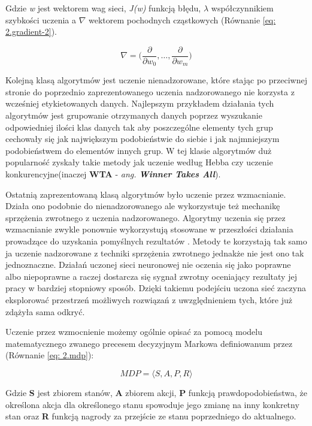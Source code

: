 \documentclass[12pt, oneside, a4paper]{report}
\begin{document}
Gdzie \textit{w} jest wektorem wag sieci, \textit{J(w)} funkcją błędu, $\lambda$ współczynnikiem szybkości uczenia a $\nabla$ wektorem pochodnych cząstkowych (Równanie \ref{eq: 2.gradient-2}).

\begin{equation}\label{eq: 2.gradient-2}
	\nabla = \bigg( \frac{\partial}{\partial w_0}, \dots ,\frac{\partial}{\partial w_m} \bigg)
\end{equation}

Kolejną klasą algorytmów jest uczenie nienadzorowane, które stając po przeciwnej stronie do poprzednio zaprezentowanego uczenia nadzorowanego nie korzysta z wcześniej etykietowanych danych. Najlepszym przykładem działania tych algorytmów jest grupowanie otrzymanych danych poprzez wyszukanie odpowiedniej ilości klas danych tak aby poszczególne elementy tych grup cechowały się jak największym podobieństwie do siebie i jak najmniejszym podobieństwem do elementów innych grup. W tej klasie algorytmów duż popularność zyskały takie metody jak uczenie według Hebba czy uczenie konkurencyjne(inaczej \textbf{WTA} - \textit{ang. \textbf{Winner Takes All}}).

Ostatnią zaprezentowaną klasą algorytmów było uczenie przez wzmacnianie. Działa ono podobnie do nienadzorowanego ale wykorzystuje też mechanikę sprzężenia zwrotnego z uczenia nadzorowanego. Algorytmy uczenia się przez wzmacnianie zwykle ponownie wykorzystują stosowane w przeszłości działania prowadzące do uzyskania pomyślnych rezultatów \citep{roelants2017deeplearning}. Metody te korzystają tak samo ja uczenie nadzorowane z techniki sprzężenia zwrotnego jednakże nie jest ono tak jednoznaczne. Działań uczonej sieci neuronowej nie oczenia się jako poprawne albo niepoprawne a raczej dostarcza się sygnał zwrotny oceniający rezultaty jej pracy w bardziej stopniowy sposób. Dzięki takiemu podejściu uczona sieć zaczyna eksplorować przestrzeń możliwych rozwiązań z uwzględnieniem tych, które już zdążyła sama odkryć. 

Uczenie przez wzmocnienie możemy ogólnie opisać za pomocą modelu matematycznego zwanego precesem decyzyjnym Markowa definiowanum przez (Równanie \ref{eq: 2.mdp}):

\begin{equation}\label{eq: 2.mdp}
	MDP = \big \langle S, A, P, R \big \rangle
\end{equation}

Gdzie \textbf{S} jest zbiorem stanów, \textbf{A} zbiorem akcji, \textbf{P} funkcją prawdopodobieństwa, że określona akcja dla określonego stanu spowoduje jego zmianę na inny konkretny stan oraz \textbf{R} funkcją nagrody za przejście ze stanu poprzedniego do aktualnego.
\end{document}
